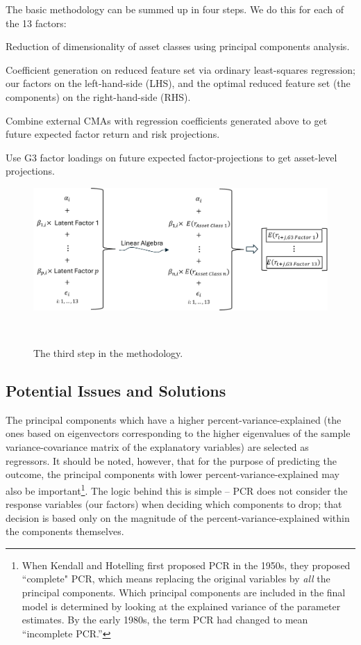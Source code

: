 \documentclass{ledger}
\begin{document}
The basic methodology can be summed up in four steps. We do this for each of the 13 factors:
\begin{compactenum}
	\item Reduction of dimensionality of asset classes using principal components analysis.
	\item Coefficient generation on reduced feature set via ordinary least-squares regression; our factors on the left-hand-side (LHS), and the optimal reduced feature set (the components) on the right-hand-side (RHS). 
	\item Combine external CMAs with regression coefficients generated above to get future expected factor return and risk projections.  
	\item Use G3 factor loadings on future expected factor-projections to get asset-level projections. \\
\end{compactenum}

\begin{figure}[!ht]
\centering
	\includegraphics[width=375pt]{Step3.pdf}
	\caption{The third step in the methodology.} ~\\
\end{figure}

\subsection{Potential Issues and Solutions}

The principal components which have a higher percent-variance-explained (the ones based on eigenvectors corresponding to the higher eigenvalues of the sample variance-covariance matrix of the explanatory variables) are selected as regressors. It should be noted, however, that for the purpose of predicting the outcome, the principal components with lower percent-variance-explained may also be important\footnote{When Kendall and Hotelling first proposed PCR in the 1950s, they proposed ``complete" PCR, which means replacing the original variables by \textit{all} the principal components. Which principal components are included in the final model is determined by looking at the explained variance of the parameter estimates. By the early 1980s, the term PCR had changed to mean ``incomplete PCR.''}. The logic behind this is simple -- PCR does not consider the response variables (our factors) when deciding which components to drop; that decision is based only on the magnitude of the percent-variance-explained within the components themselves.\\
\end{document}
